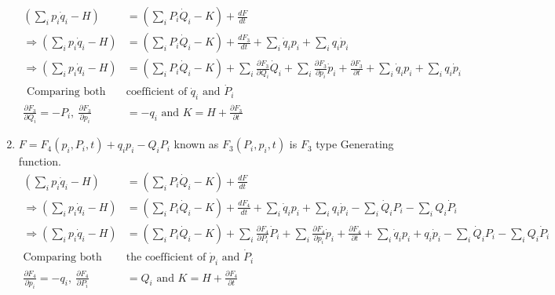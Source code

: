 \begin{enumerate}
	$$
	\begin{aligned}
	\left(\sum_{i} p_{i} \dot{q}_{i}-H\right)&=\left(\sum_{i} P_{i} \dot{Q}_{i}-K\right)+\frac{d F}{d t} \\
	\Rightarrow\left(\sum_{i} p_{i} \dot{q}_{i}-H\right)&=\left(\sum_{i} P_{i} \dot{Q}_{i}-K\right)+\frac{d F_{3}}{d t}+\sum_{i} \dot{q}_{i} p_{i}+\sum_{i} q_{i} \dot{p}_{i} \\
	\Rightarrow\left(\sum_{i} p_{i} \dot{q}_{i}-H\right)&=\left(\sum_{i} P_{i} \dot{Q}_{i}-K\right)+\sum_{i} \frac{\partial F_{3}}{\partial Q_{i}} \dot{Q}_{i}+\sum_{i} \frac{\partial F_{3}}{\partial p_{i}} \dot{p}_{i}+\frac{\partial F_{3}}{\partial t}+\sum_{i} \dot{q}_{i} p_{i}+\sum_{i} q_{i} \dot{p}_{i}\\
	\text{	Comparing both the }&\text{coefficient of $\dot{q}_{i}$ and $\dot{P}_{i}$}\\
	\frac{\partial F_{3}}{\partial Q_{i}}=-P_{i},\  \frac{\partial F_{3}}{\partial p_{i}}&=-q_{i}\text{ and }K=H+\frac{\partial F_{3}}{\partial t}
	\end{aligned}
	$$
	\item  $F=F_{4}\left(p_{i}, P_{i}, t\right)+q_{i} p_{i}-Q_{i} P_{i}$ known as $F_{3}\left(P_{i}, p_{i}, t\right)$ is $F_{3}$ type Generating function.
	$$
	\begin{aligned}
	\left(\sum_{i} p_{i} \dot{q}_{i}-H\right)&=\left(\sum_{i} P_{i} \dot{Q}_{i}-K\right)+\frac{d F}{d t} \\
	\Rightarrow\left(\sum_{i} p_{i} \dot{q}_{i}-H\right)&=\left(\sum_{i} P_{i} \dot{Q}_{i}-K\right)+\frac{d F_{4}}{d t}+\sum_{i} \dot{q}_{i} p_{i}+\sum_{i} q_{i} \dot{p}_{i}-\sum_{i} \dot{Q}_{i} P_{i}-\sum_{i} Q_{i} \dot{P}_{i}\\
	\Rightarrow\left(\sum_{i} p_{i} \dot{q}_{i}-H\right)&=\left(\sum_{i} P_{i} \dot{Q}_{i}-K\right)+\sum_{i} \frac{\partial F_{4}}{\partial P_{i}} \dot{P}_{i}+\sum_{i} \frac{\partial F_{4}}{\partial p_{i}} \dot{p}_{i}+\frac{\partial F_{4}}{\partial t}+\sum_{i} \dot{q}_ip_i+q_i\dot{p}_i-\sum_{i} \dot{Q}_iP_i-\sum_{i} Q_i\dot{P}_i\\
	\text{Comparing both }&\text{the coefficient of $\dot{p}_{i}$ and $\dot{P}_{i}$}\\
	\frac{\partial F_{4}}{\partial p_{i}}=-q_{i},\  \frac{\partial F_{4}}{\partial P_{i}}&=Q_{i} \text { and } K=H+\frac{\partial F_{4}}{\partial t}
	\end{aligned}
	$$
\end{enumerate}
